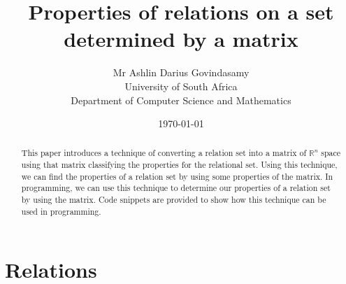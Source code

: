 \documentclass{report}
\title{Properties of relations on a set determined by a matrix}
\author{Mr Ashlin Darius Govindasamy\\ \large{University of South Africa} \\ \large{Department of Computer Science and Mathematics}}
\date{\today}
\begin{document}
\maketitle
\newpage


\begin{abstract}
This paper introduces a technique of converting a relation set into a matrix of $\mathbb{R}^{n}$ space using that matrix classifying the properties for the relational set.
Using this technique, we can find the properties of a relation set by using some properties of the matrix. In programming, we can use this technique to determine our properties of a relation set by using the matrix. Code snippets are provided to show how this technique can be used in programming.
\end{abstract}

\newpage
\tableofcontents



\chapter{Relations}


\newpage
\end{document}
